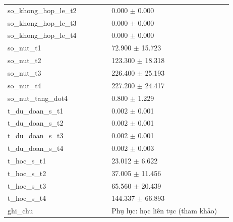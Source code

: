 \begin{longtable}{p{0.43\linewidth}p{0.50\linewidth}}
so\_\allowbreak khong\_\allowbreak hop\_\allowbreak le\_\allowbreak t2 & 0.000 $\pm$ 0.000 \\
so\_\allowbreak khong\_\allowbreak hop\_\allowbreak le\_\allowbreak t3 & 0.000 $\pm$ 0.000 \\
so\_\allowbreak khong\_\allowbreak hop\_\allowbreak le\_\allowbreak t4 & 0.000 $\pm$ 0.000 \\
so\_\allowbreak nut\_\allowbreak t1 & 72.900 $\pm$ 15.723 \\
so\_\allowbreak nut\_\allowbreak t2 & 123.300 $\pm$ 18.318 \\
so\_\allowbreak nut\_\allowbreak t3 & 226.400 $\pm$ 25.193 \\
so\_\allowbreak nut\_\allowbreak t4 & 227.200 $\pm$ 24.417 \\
so\_\allowbreak nut\_\allowbreak tang\_\allowbreak dot4 & 0.800 $\pm$ 1.229 \\
t\_\allowbreak du\_\allowbreak doan\_\allowbreak s\_\allowbreak t1 & 0.002 $\pm$ 0.001 \\
t\_\allowbreak du\_\allowbreak doan\_\allowbreak s\_\allowbreak t2 & 0.002 $\pm$ 0.001 \\
t\_\allowbreak du\_\allowbreak doan\_\allowbreak s\_\allowbreak t3 & 0.002 $\pm$ 0.001 \\
t\_\allowbreak du\_\allowbreak doan\_\allowbreak s\_\allowbreak t4 & 0.002 $\pm$ 0.003 \\
t\_\allowbreak hoc\_\allowbreak s\_\allowbreak t1 & 23.012 $\pm$ 6.622 \\
t\_\allowbreak hoc\_\allowbreak s\_\allowbreak t2 & 37.005 $\pm$ 11.456 \\
t\_\allowbreak hoc\_\allowbreak s\_\allowbreak t3 & 65.560 $\pm$ 20.439 \\
t\_\allowbreak hoc\_\allowbreak s\_\allowbreak t4 & 144.337 $\pm$ 66.893 \\
ghi\_\allowbreak chu & Phụ lục: học liên tục (tham khảo) \\
\midrule
\bottomrule
\end{longtable}
